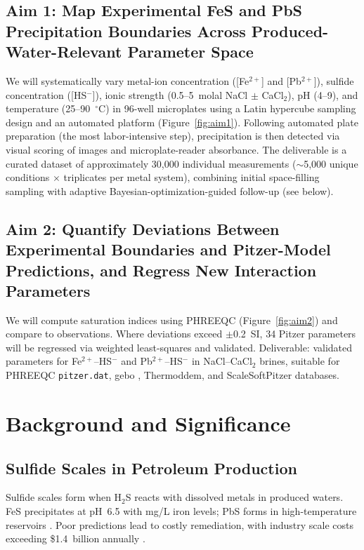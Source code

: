 \documentclass[12pt]{article}
\begin{document}
\subsection{Aim 1: Map Experimental FeS and PbS Precipitation Boundaries Across Produced-Water-Relevant Parameter Space}

We will systematically vary metal-ion concentration ([Fe$^{2+}$] and [Pb$^{2+}$]), sulfide concentration ([HS$^-$]), ionic strength (0.5--5~molal NaCl $\pm$ CaCl$_2$), pH (4--9), and temperature (25--90~$^\circ$C) in 96-well microplates using a Latin hypercube sampling design and an automated platform (Figure~\ref{fig:aim1}). Following automated plate preparation (the most labor-intensive step), precipitation is then detected via visual scoring of images and microplate-reader absorbance. The deliverable is a curated dataset of approximately 30,000 individual measurements ($\sim$5,000 unique conditions $\times$ triplicates per metal system), combining initial space-filling sampling with adaptive Bayesian-optimization-guided follow-up (see below).

\subsection{Aim 2: Quantify Deviations Between Experimental Boundaries and Pitzer-Model Predictions, and Regress New Interaction Parameters}

We will compute saturation indices using PHREEQC (Figure~\ref{fig:aim2}) and compare to observations. Where deviations exceed $\pm$0.2~SI, 34 Pitzer parameters will be regressed via weighted least-squares and validated. Deliverable: validated parameters for Fe$^{2+}$--HS$^-$ and Pb$^{2+}$--HS$^-$ in NaCl--CaCl$_2$ brines, suitable for PHREEQC \texttt{pitzer.dat}, gebo \cite{bozau2013}, Thermoddem, and ScaleSoftPitzer databases.

\section{Background and Significance}

\subsection{Sulfide Scales in Petroleum Production}

Sulfide scales form when H$_2$S reacts with dissolved metals in produced waters. FeS precipitates at pH~6.5 with mg/L iron levels; PbS forms in high-temperature reservoirs \cite{wylde2014,alharbi2017}. Poor predictions lead to costly remediation, with industry scale costs exceeding \$1.4~billion annually \cite{hamza2021}.
\end{document}
